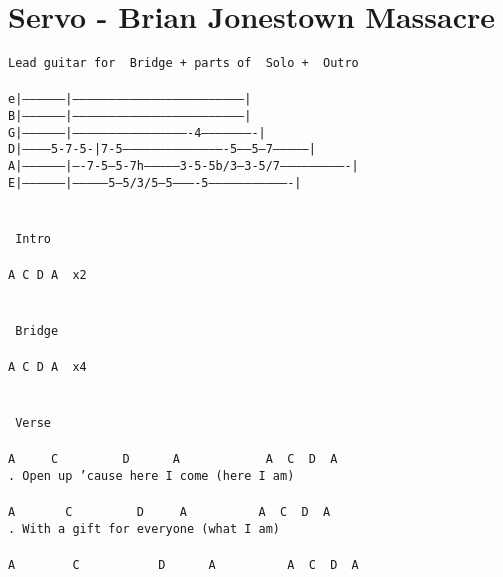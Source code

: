 \newpage
\section{Servo - Brian Jonestown Massacre}
\label{Servo - Brian Jonestown Massacre}
\texttt{Lead\ guitar\ for\ \lbrack\ Bridge\rbrack\ +\ parts\ of\ \lbrack\ Solo\rbrack\ +\ \lbrack\ Outro\rbrack\\
\\
e|------------------|------------------------------------------------------------------------|\\
B|------------------|------------------------------------------------------------------------|\\
G|------------------|-------------------------------------------------4----------------------|\\
D|------------5-7-5-|7-5-------------------------------------------5------5---7--------------|\\
A|------------------|----7-5---5-7h--------------3-5-5b/3---3-5/7----------------------------|\\
E|------------------|---------------5--5/3/5---5----------5----------------------------------|\\
\\
\\
\lbrack\ Intro\rbrack\\
\\
A\ C\ D\ A\ \ x2\\
\\
\\
\lbrack\ Bridge\rbrack\\
\\
A\ C\ D\ A\ \ x4\\
\\
\\
\lbrack\ Verse\rbrack\\
\\
A\ \ \ \ \ C\ \ \ \ \ \ \ \ \ D\ \ \ \ \ \ A\ \ \ \ \ \ \ \ \ \ \ \ A\ \ C\ \ D\ \ A\ \ \\
.\ Open\ up\ 'cause\ here\ I\ come\ (here\ I\ am)\\
\\
A\ \ \ \ \ \ \ C\ \ \ \ \ \ \ \ \ D\ \ \ \ \ A\ \ \ \ \ \ \ \ \ \ A\ \ C\ \ D\ \ A\ \ \\
.\ With\ a\ gift\ for\ everyone\ (what\ I\ am)\\
\\
A\ \ \ \ \ \ \ \ C\ \ \ \ \ \ \ \ \ \ \ D\ \ \ \ \ \ A\ \ \ \ \ \ \ \ \ \ A\ \ C\ \ D\ \ A\ \ \\
}
